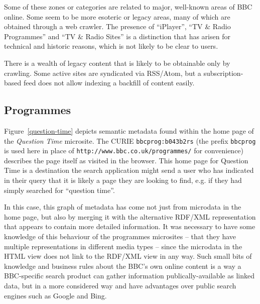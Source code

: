 Some of these zones or categories are related to major, well-known areas of
BBC online. Some seem to be more esoteric or legacy areas, many of which
are obtained through a web crawler. The presence of ``iPlayer'',
``TV \& Radio Programmes'' and ``TV \& Radio Sites'' is a distinction that
has arisen for technical and historic reasons, which is not likely to be
clear to users.

There is a wealth of legacy content that is likely to be obtainable only by
crawling. Some active sites are syndicated via RSS/Atom, but a subscription-based
feed does not allow indexing a backfill of content easily.

\subsection{Programmes}
\label{programmes}

Figure~\ref{question-time} depicts semantic metadata found within the home page
of the \emph{Question Time} microsite. The CURIE\cite{birbeck2009curie}
\texttt{bbcprog:b043b2rs} (the prefix \texttt{bbcprog} is used here in place
of \texttt{http://www.bbc.co.uk/programmes/} for convenience)
describes the page itself as visited in the
browser. This home page for Question Time is a destination the search
application might send a user who has indicated in their query that it
is likely a page they are looking to find, e.g. if they had simply
searched for ``question time''.

In this case, this graph of metadata has come not just from microdata
in the home page, but also by merging it with the alternative RDF/XML
representation that appears to contain more detailed information.
It was necessary to have some knowledge of this behaviour of the
programmes microsites -- that they have multiple representations
in different media types -- since the microdata in the HTML view
does not link to the RDF/XML view in any way. Such small bits of
knowledge and business rules about the BBC's own online content
is a way a BBC-specific search product can gather information publically-available
as linked data, but in a more considered way and have advantages over
public search engines such as Google and Bing.

\begin{sidewaysfigure}
  \begin{center}
  \end{center}
  \caption{Semantic metadata found within \emph{Question Time} home page}
  \label{question-time}
\end{sidewaysfigure}

